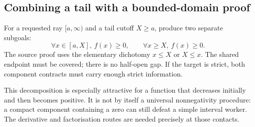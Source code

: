 \subsection{Combining a tail with a bounded-domain proof}

For a requested ray $[a,\infty)$ and a tail cutoff $X\ge a$, produce two
separate subgoals:
\[
 \forall x\in[a,X],\ f(x)\ge0,
 \qquad
 \forall x\ge X,\ f(x)\ge0.
\]
The source proof uses the elementary dichotomy $x\le X$ or $X\le x$.
The shared endpoint must be covered; there is no half-open gap. If the target
is strict, both component contracts must carry enough strict information.

This decomposition is especially attractive for a function that decreases
initially and then becomes positive. It is not by itself a universal
nonnegativity procedure: a compact component containing a zero can still defeat
a simple interval worker. The derivative and factorisation routes are needed
precisely at those contacts.
